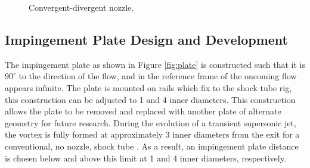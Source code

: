 \begin{figure}[!tbp]
  \centering
  \hfill
  \caption{Convergent-divergent nozzle.}
  \label{fig:con_div_noz}
\end{figure}

\subsection{Impingement Plate Design and Development}
The impingement plate as shown in Figure \ref{fig:plate} is constructed such that it is $90^{\circ}$ to the direction of the flow, and in the reference frame of the oncoming flow appears infinite. The plate is mounted on rails which fix to the shock tube rig, this construction can be adjusted to 1 and 4 inner diameters. This construction allows the plate to be removed and replaced with another plate of alternate geometry for future research. During the evolution of a transient supersonic jet, the vortex is fully formed at approximately 3 inner diameters from the exit for a conventional, no nozzle, shock tube \cite{mariani2013a}. As a result, an impingement plate distance is chosen below and above this limit at 1 and 4 inner diameters, respectively. 

